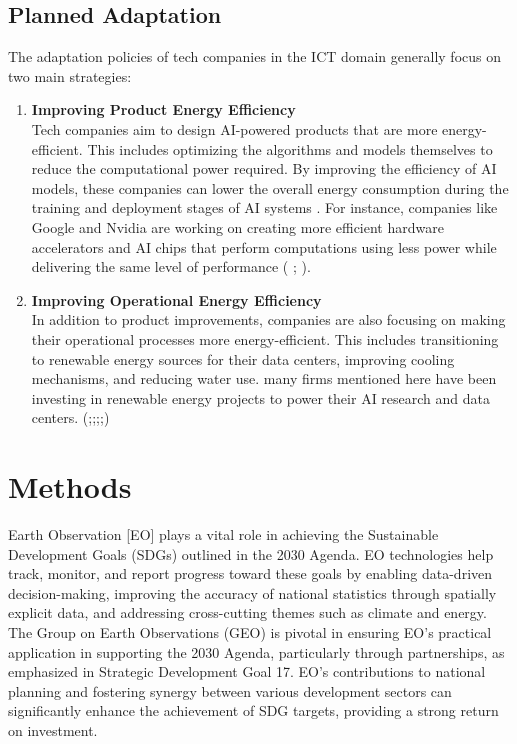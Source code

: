 \documentclass[12pt]{article}
\begin{document}
\subsection*{Planned Adaptation}
The adaptation policies of tech companies in the ICT domain generally focus on two main strategies:
\begin{enumerate}
    \item \textbf{Improving Product Energy Efficiency} \\ Tech companies aim to design AI-powered products that are more energy-efficient. This includes optimizing the algorithms and 
    models themselves to reduce the computational power required. By improving the efficiency of AI models, these companies can lower the overall energy consumption during 
    the training and deployment stages of AI systems . For instance, companies like Google and Nvidia are working on creating more efficient hardware accelerators and AI 
    chips that perform computations using less power while delivering the same level of performance (\cite{google_2024_environmental} ; \cite{nvidia_2024}).
    \item \textbf{Improving Operational Energy Efficiency} \\ In addition to product improvements, companies are also focusing on making their operational processes more energy-efficient. This includes 
    transitioning to renewable energy sources for their data centers, improving cooling mechanisms, and reducing water use. many firms mentioned here have been investing in renewable energy 
    projects to power their AI research and data centers. (\cite{apple_2024_environmental};\cite{amazon_2023_amazon};\cite{meta_sustainability_2023};\cite{google_2024_environmental};\cite{nvidia_2024}) 
     
\end{enumerate}

\section*{Methods}
Earth Observation [EO] plays a vital role in achieving the Sustainable Development Goals (SDGs) outlined in the 2030 Agenda. EO technologies help track, monitor, 
and report progress toward these goals by enabling data-driven decision-making, improving the accuracy of national statistics through spatially explicit data, and 
addressing cross-cutting themes such as climate and energy. The Group on Earth Observations (GEO) is pivotal in ensuring EO's practical application in 
supporting the 2030 Agenda, particularly through partnerships, as emphasized in Strategic Development Goal 17. EO's contributions to national planning and fostering 
synergy between various development sectors can significantly enhance the achievement of SDG targets, providing a strong return on investment.
\end{document}
